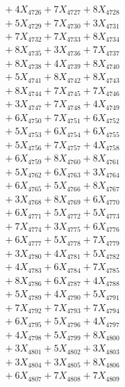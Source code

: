 \documentclass[a4paper,10pt]{article}
\begin{document}
{\begin{align}
&\;  + 4 X_{4726} + 7 X_{4727} + 8 X_{4728} \\[0.3ex]
&\;  + 5 X_{4729} + 7 X_{4730} + 3 X_{4731} \\[0.3ex]
&\;  + 7 X_{4732} + 7 X_{4733} + 8 X_{4734} \\[0.3ex]
&\;  + 8 X_{4735} + 3 X_{4736} + 7 X_{4737} \\[0.3ex]
&\;  + 8 X_{4738} + 4 X_{4739} + 8 X_{4740} \\[0.3ex]
&\;  + 5 X_{4741} + 8 X_{4742} + 8 X_{4743} \\[0.3ex]
&\;  + 8 X_{4744} + 7 X_{4745} + 7 X_{4746} \\[0.3ex]
&\;  + 3 X_{4747} + 7 X_{4748} + 4 X_{4749} \\[0.5ex]\allowbreak
&\;  + 6 X_{4750} + 7 X_{4751} + 6 X_{4752} \\[0.3ex]
&\;  + 5 X_{4753} + 6 X_{4754} + 6 X_{4755} \\[0.3ex]
&\;  + 5 X_{4756} + 7 X_{4757} + 4 X_{4758} \\[0.3ex]
&\;  + 6 X_{4759} + 8 X_{4760} + 8 X_{4761} \\[0.3ex]
&\;  + 5 X_{4762} + 6 X_{4763} + 3 X_{4764} \\[0.3ex]
&\;  + 6 X_{4765} + 5 X_{4766} + 8 X_{4767} \\[0.3ex]
&\;  + 3 X_{4768} + 8 X_{4769} + 6 X_{4770} \\[0.3ex]
&\;  + 6 X_{4771} + 5 X_{4772} + 5 X_{4773} \\[0.3ex]
&\;  + 7 X_{4774} + 3 X_{4775} + 6 X_{4776} \\[0.3ex]
&\;  + 6 X_{4777} + 5 X_{4778} + 7 X_{4779} \\[0.5ex]\allowbreak
&\;  + 3 X_{4780} + 4 X_{4781} + 5 X_{4782} \\[0.3ex]
&\;  + 4 X_{4783} + 6 X_{4784} + 7 X_{4785} \\[0.3ex]
&\;  + 8 X_{4786} + 6 X_{4787} + 4 X_{4788} \\[0.3ex]
&\;  + 5 X_{4789} + 4 X_{4790} + 5 X_{4791} \\[0.3ex]
&\;  + 7 X_{4792} + 7 X_{4793} + 7 X_{4794} \\[0.3ex]
&\;  + 6 X_{4795} + 5 X_{4796} + 4 X_{4797} \\[0.3ex]
&\;  + 4 X_{4798} + 5 X_{4799} + 8 X_{4800} \\[0.3ex]
&\;  + 3 X_{4801} + 5 X_{4802} + 3 X_{4803} \\[0.3ex]
&\;  + 3 X_{4804} + 3 X_{4805} + 8 X_{4806} \\[0.3ex]
&\;  + 6 X_{4807} + 7 X_{4808} + 7 X_{4809} \\[0.5ex]\allowbreak

\end{align}}
\end{document}
